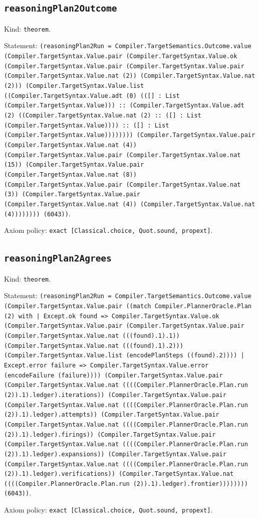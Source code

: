 \documentclass[11pt]{article}
\begin{document}
\subsection*{\texttt{reasoningPlan2Outcome}}
\noindent Kind: \texttt{theorem}.\par
\noindent Statement: \texttt{(reasoningPlan2Run = Compiler.TargetSemantics.Outcome.value (Compiler.TargetSyntax.Value.pair (Compiler.TargetSyntax.Value.ok (Compiler.TargetSyntax.Value.pair (Compiler.TargetSyntax.Value.pair (Compiler.TargetSyntax.Value.nat (2)) (Compiler.TargetSyntax.Value.nat (2))) (Compiler.TargetSyntax.Value.list ((Compiler.TargetSyntax.Value.adt (0) (([] : List (Compiler.TargetSyntax.Value))) :: (Compiler.TargetSyntax.Value.adt (2) ((Compiler.TargetSyntax.Value.nat (2) :: ([] : List (Compiler.TargetSyntax.Value)))) :: ([] : List (Compiler.TargetSyntax.Value)))))))) (Compiler.TargetSyntax.Value.pair (Compiler.TargetSyntax.Value.nat (4)) (Compiler.TargetSyntax.Value.pair (Compiler.TargetSyntax.Value.nat (15)) (Compiler.TargetSyntax.Value.pair (Compiler.TargetSyntax.Value.nat (8)) (Compiler.TargetSyntax.Value.pair (Compiler.TargetSyntax.Value.nat (3)) (Compiler.TargetSyntax.Value.pair (Compiler.TargetSyntax.Value.nat (4)) (Compiler.TargetSyntax.Value.nat (4)))))))) (6043))}.\par
\noindent Axiom policy: \texttt{exact [Classical.choice, Quot.sound, propext]}.\par
\subsection*{\texttt{reasoningPlan2Agrees}}
\noindent Kind: \texttt{theorem}.\par
\noindent Statement: \texttt{(reasoningPlan2Run = Compiler.TargetSemantics.Outcome.value (Compiler.TargetSyntax.Value.pair ((match Compiler.PlannerOracle.Plan (2) with | Except.ok found => Compiler.TargetSyntax.Value.ok (Compiler.TargetSyntax.Value.pair (Compiler.TargetSyntax.Value.pair (Compiler.TargetSyntax.Value.nat (((found).1).1)) (Compiler.TargetSyntax.Value.nat (((found).1).2))) (Compiler.TargetSyntax.Value.list (encodePlanSteps ((found).2)))) | Except.error failure => Compiler.TargetSyntax.Value.error (encodeFailure (failure)))) (Compiler.TargetSyntax.Value.pair (Compiler.TargetSyntax.Value.nat ((((Compiler.PlannerOracle.Plan.run (2)).1).ledger).iterations)) (Compiler.TargetSyntax.Value.pair (Compiler.TargetSyntax.Value.nat ((((Compiler.PlannerOracle.Plan.run (2)).1).ledger).attempts)) (Compiler.TargetSyntax.Value.pair (Compiler.TargetSyntax.Value.nat ((((Compiler.PlannerOracle.Plan.run (2)).1).ledger).firings)) (Compiler.TargetSyntax.Value.pair (Compiler.TargetSyntax.Value.nat ((((Compiler.PlannerOracle.Plan.run (2)).1).ledger).expansions)) (Compiler.TargetSyntax.Value.pair (Compiler.TargetSyntax.Value.nat ((((Compiler.PlannerOracle.Plan.run (2)).1).ledger).verifications)) (Compiler.TargetSyntax.Value.nat ((((Compiler.PlannerOracle.Plan.run (2)).1).ledger).frontier)))))))) (6043))}.\par
\noindent Axiom policy: \texttt{exact [Classical.choice, Quot.sound, propext]}.\par
\end{document}
